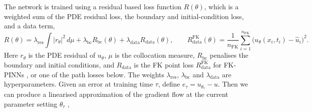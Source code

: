 \documentclass[english]{article}
\begin{document}
The network is trained using a residual based loss function $R(\theta)$, which is a weighted sum of the PDE residual loss, the boundary and initial-condition loss, and a data term,
\begin{equation}\label{eq:loss}
  R(\theta) = \lambda_\mathrm{res}\int |r_\theta|^2\,d\mu + \lambda_\mathrm{bc}R_\mathrm{bc}(\theta) + \lambda_\mathrm{data}R_\mathrm{data}(\theta),
  \qquad
  R^\mathrm{FK}_\mathrm{data}(\theta) = \frac{1}{n_\mathrm{FK}}\sum_{i=1}^{n_\mathrm{FK}}\big(u_\theta(x_i,t_i)-\hat u_i\big)^2 .
\end{equation}
Here $r_\theta$ is the PDE residual of $u_\theta$, $\mu$ is the collocation measure, $R_\mathrm{bc}$ penalises the boundary and initial conditions, and $R_\mathrm{data}$ is the FK point loss $R^\mathrm{FK}_\mathrm{data}$ for FK-PINNs \cite{tepakbong2026taming}, or one of the path losses below. The weights $\lambda_\mathrm{res}$, $\lambda_\mathrm{bc}$ and $\lambda_\mathrm{data}$ are hyperparameters. Given an error at training time $\tau$, define $e_\tau = u_{\theta_\tau} - u$. Then we can produce a linearised approximation of the gradient flow at the current parameter setting $\theta_\tau$ \cite{jacot2018ntk,deryck2024operator},
\end{document}
